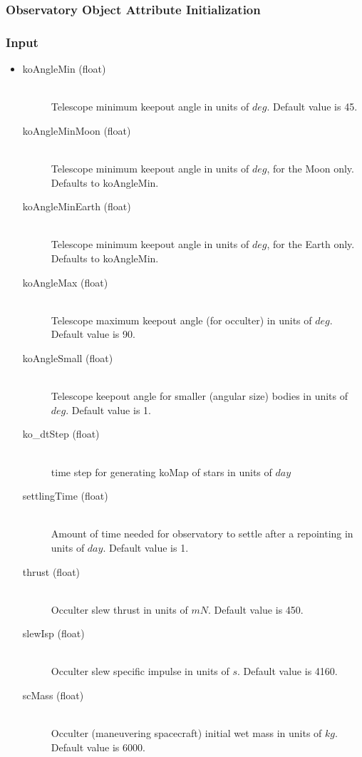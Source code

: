 \documentclass[cleanfoot]{asme2ej}
\begin{document}
\label{sec:observatory}
\subsubsection{Observatory Object Attribute Initialization}

\subsubsection*{Input}
\begin{itemize}
\item
\begin{description}
    \item[koAngleMin (float)] \hfill \\ Telescope minimum keepout angle in units of $deg$. Default value is 45.
    \item[koAngleMinMoon (float)] \hfill \\ Telescope minimum keepout angle in units of $deg$, for the Moon only. Defaults to koAngleMin.
    \item[koAngleMinEarth (float)] \hfill \\ Telescope minimum keepout angle in units of $deg$, for the Earth only. Defaults to koAngleMin.
    \item[koAngleMax (float)] \hfill \\ Telescope maximum keepout angle (for occulter) in units of $deg$. Default value is 90.
    \item[koAngleSmall (float)] \hfill \\ Telescope keepout angle for smaller (angular size) bodies in units of $deg$. Default value is 1.
    \item[ko\_dtStep (float)] \hfill \\ time step for generating koMap of stars  in units of $ day $ 
    \item[settlingTime (float)] \hfill \\ Amount of time needed for observatory to settle after a repointing in units of $ day $. Default value is 1.
    \item[thrust (float)] \hfill \\ Occulter slew thrust in units of $ mN $. Default value is 450.
    \item[slewIsp (float)] \hfill \\ Occulter slew specific impulse in units of $ s $. Default value is 4160.
    \item[scMass (float)] \hfill \\ Occulter (maneuvering spacecraft) initial wet mass in units of $ kg $. Default value is 6000.

\end{description}
\end{itemize}
\end{document}
